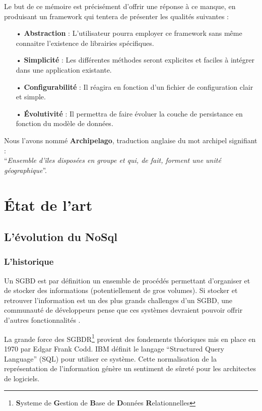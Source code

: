 \documentclass[a4paper,fleqn,12pt,oneside]{report}
\begin{document}
Le but de ce mémoire est précisément d'offrir une réponse à ce manque, en produisant un framework qui tentera de présenter les qualités suivantes :
\begin{itemize}
\item[•] \textbf{Abstraction} : L'utilisateur pourra employer ce framework sans même connaitre l'existence de librairies spécifiques.
\item[•] \textbf{Simplicité} : Les différentes méthodes seront explicites et faciles à intégrer dans une application existante.
\item[•] \textbf{Configurabilité} : Il réagira en fonction d'un fichier de configuration clair et simple.
\item[•] \textbf{\'Evolutivité} : Il permettra de faire évoluer la couche de persistance en fonction du modèle de données.
\end{itemize}

\begin{center}
Nous l'avons nommé \textbf{Archipelago}, traduction anglaise du mot archipel signifiant : \\ \enquote{\textit{Ensemble d'îles disposées en groupe et qui, de fait, forment une unité géographique}}\cite{linternaute}.
\end{center}
 
\part{État de l'art}

\chapter{L'évolution du NoSql}


\section{L'historique}
\label{NoSqlEvol}

Un SGBD est par définition un ensemble de procédés permettant d'organiser et de stocker des informations (potentiellement de gros volumes). Si stocker et retrouver l'information est un des plus grands challenges d'un SGBD, une communauté de développeurs pense que ces systèmes devraient pouvoir offrir d'autres fonctionnalités \cite{coupaye1998modeles}.

La grande force des SGBDR\footnote{\textbf{S}ysteme de \textbf{G}estion de \textbf{B}ase de \textbf{D}onnées 
\textbf{R}elationnelles} provient des fondements théoriques mis en place en 1970 par Edgar Frank Codd. IBM définit le langage \enquote{Structured Query Language} (SQL) pour utiliser ce système. Cette normalisation de la représentation de l'information génère un sentiment de sûreté pour les architectes de logiciels\cite{bruchez2016bases}.
 
\end{document}
